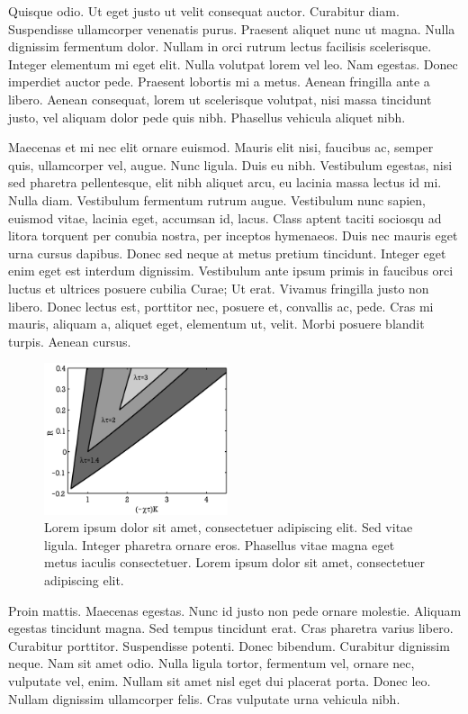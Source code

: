 \documentclass[nochapterpage,bigchapter,linedtoc,longdoc,colorback,accentcolor=tud4c]{tudreport}
\begin{document}
    Quisque odio. Ut eget justo ut velit consequat auctor. Curabitur diam. Suspendisse ullamcorper venenatis purus. Praesent aliquet nunc ut magna. Nulla dignissim fermentum dolor. Nullam in orci rutrum lectus facilisis scelerisque. Integer elementum mi eget elit. Nulla volutpat lorem vel leo. Nam egestas. Donec imperdiet auctor pede. Praesent lobortis mi a metus. Aenean fringilla ante a libero. Aenean consequat, lorem ut scelerisque volutpat, nisi massa tincidunt justo, vel aliquam dolor pede quis nibh. Phasellus vehicula aliquet nibh.

    Maecenas et mi nec elit ornare euismod. Mauris elit nisi, faucibus ac, semper quis, ullamcorper vel, augue. Nunc ligula. Duis eu nibh. Vestibulum egestas, nisi sed pharetra pellentesque, elit nibh aliquet arcu, eu lacinia massa lectus id mi. Nulla diam. Vestibulum fermentum rutrum augue. Vestibulum nunc sapien, euismod vitae, lacinia eget, accumsan id, lacus. Class aptent taciti sociosqu ad litora torquent per conubia nostra, per inceptos hymenaeos. Duis nec mauris eget urna cursus dapibus. Donec sed neque at metus pretium tincidunt. Integer eget enim eget est interdum dignissim. Vestibulum ante ipsum primis in faucibus orci luctus et ultrices posuere cubilia Curae; Ut erat. Vivamus fringilla justo non libero. Donec lectus est, porttitor nec, posuere et, convallis ac, pede. Cras mi mauris, aliquam a, aliquet eget, elementum ut, velit. Morbi posuere blandit turpis. Aenean cursus.
             \begin{figure}
                 \centering
                 \includegraphics[clip,width=0.48\textwidth]{TUDreport-fig}
                 \caption[Lorem ipsum dolor sit amet]{Lorem ipsum dolor sit amet, consectetuer adipiscing elit. Sed vitae ligula. Integer pharetra ornare eros. Phasellus vitae magna eget metus iaculis consectetuer. Lorem ipsum dolor sit amet, consectetuer adipiscing elit.}
             \end{figure}

    Proin mattis. Maecenas egestas. Nunc id justo non pede ornare molestie. Aliquam egestas tincidunt magna. Sed tempus tincidunt erat. Cras pharetra varius libero. Curabitur porttitor. Suspendisse potenti. Donec bibendum. Curabitur dignissim neque. Nam sit amet odio. Nulla ligula tortor, fermentum vel, ornare nec, vulputate vel, enim. Nullam sit amet nisl eget dui placerat porta. Donec leo. Nullam dignissim ullamcorper felis. Cras vulputate urna vehicula nibh.
\end{document}
